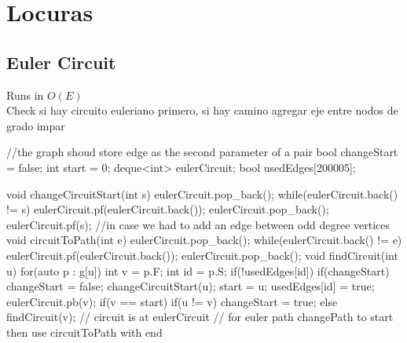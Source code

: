 \documentclass[10pt, landscape, twocolumn, a4paper, notitlepage]{article}
\begin{document}
\section{Locuras}
\subsection{Euler Circuit}
Runs in $O(E)$\\
Check si hay circuito euleriano primero, si hay camino agregar eje entre nodos de grado impar \\
\begin{code}
//the graph shoud store edge as the second parameter of a pair
bool changeStart = false;
int start = 0;
deque<int> eulerCircuit;
bool usedEdges[200005];
 
void changeCircuitStart(int s) {
    eulerCircuit.pop_back();
    while(eulerCircuit.back() != s) {
        eulerCircuit.pf(eulerCircuit.back());
        eulerCircuit.pop_back();
    }
    eulerCircuit.pf(s);
}
//in case we had to add an edge between odd degree vertices
void circuitToPath(int e) {
    eulerCircuit.pop_back();
    while(eulerCircuit.back() != e) {
        eulerCircuit.pf(eulerCircuit.back());
        eulerCircuit.pop_back();
    }
}
void findCircuit(int u) {
    for(auto p : g[u]) {
        int v = p.F;
        int id = p.S;
        if(!usedEdges[id]) {
            if(changeStart) {
                changeStart = false;
                changeCircuitStart(u); start = u;
            }
            usedEdges[id] = true;
            eulerCircuit.pb(v);
            if(v == start) {
                if(u != v)  {
                    changeStart = true;
                }
            }
            else {
                findCircuit(v);   
            }
        }
    }
    // circuit is at eulerCircuit
    // for euler path changePath to start then use circuitToPath with end
}
\end{code}
\end{document}
